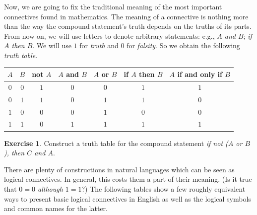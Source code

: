 \documentclass[12pt,notitlepage]{article}
\theoremstyle{plain}
\theoremstyle{definition}
\newtheorem{exc}[thm]{Exercise}
\theoremstyle{plain}
\newcommand{\1}{\mathbf{1}}
\newcommand{\0}{\mathbf{0}}
\begin{document}
Now, we are going to fix the traditional meaning of the most important connectives found in mathematics. The meaning of a connective is nothing more than the way the compound statement's truth depends on the truths of its parts. From now on, we will use letters to denote arbitrary statements: e.g., \emph{$A$ and $B$}; \emph{if $A$ then $B$}. We will use $1$ for \emph{truth} and $0$ for \emph{falsity}. So we obtain the following \emph{truth table}.
\begin{center}
\begin{tabular}{| c c | c | c | c | c | c |}
\hline
$A$ & $B$ & not $A$  &$A$ and $B$&$A$ or $B$&if $A$ then $B$ &$A$ if and only if $B$\\
\hline
$0$&$0$&$1$&$0$&$0$&$1$&$1$\\
$0$&$1$&$1$&$0$&$1$&$1$&$0$\\
$1$&$0$&$0$&$0$&$1$&$0$&$0$\\
$1$&$1$&$0$&$1$&$1$&$1$&$1$\\
\hline
\end{tabular}
\end{center}
\begin{exc}
Construct a truth table for the compound statement \emph{if not ($A$ or $B$), then $C$ and $A$}.
\end{exc}

There are plenty of constructions in natural languages which can be seen as logical connectives. In general, this costs them a part of their meaning. (Is it true that \emph{$0 = 0$ although $1 = 1$}?) The following tables show a few roughly equivalent ways to present basic logical connectives in English as well as the logical symbols and common names for the latter.
\end{document}
